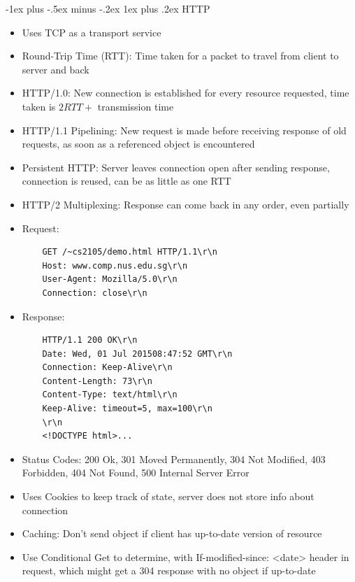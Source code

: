 \documentclass[10pt, landscape]{article}
\makeatletter
\renewcommand{\subsection}{\@startsection{subsection}{3}{0mm}%
                                {-1ex plus -.5ex minus -.2ex}%
                                {1ex plus .2ex}%
                                {\normalfont\small\bfseries}}%
\makeatother
\begin{document}
\begin{multicols*}{3}
\subsection{HTTP}
\begin{itemize}
    \item Uses TCP as a transport service
    \item Round-Trip Time (RTT): Time taken for a packet to travel from client to server and back
    \item HTTP/1.0: New connection is established for every resource requested, time taken is $2RTT+$ transmission time
    \item HTTP/1.1 Pipelining: New request is made before receiving response of old requests, as soon as a referenced object is encountered
    \item Persistent HTTP: Server leaves connection open after sending response, connection is reused, can be as little as one RTT
    \item HTTP/2 Multiplexing: Response can come back in any order, even partially
    \item Request:
\begin{verbatim}
    GET /~cs2105/demo.html HTTP/1.1\r\n
    Host: www.comp.nus.edu.sg\r\n
    User-Agent: Mozilla/5.0\r\n
    Connection: close\r\n
\end{verbatim}
    \item Response:
\begin{verbatim}
    HTTP/1.1 200 OK\r\n
    Date: Wed, 01 Jul 201508:47:52 GMT\r\n
    Connection: Keep-Alive\r\n
    Content-Length: 73\r\n
    Content-Type: text/html\r\n
    Keep-Alive: timeout=5, max=100\r\n
    \r\n
    <!DOCTYPE html>...
\end{verbatim}
    \item Status Codes: 200 Ok, 301 Moved Permanently, 304 Not Modified, 403 Forbidden, 404 Not Found, 500 Internal Server Error
    \item Uses Cookies to keep track of state, server does not store info about connection
    \item Caching: Don't send object if client has up-to-date version of resource
    \item Use Conditional Get to determine, with If-modified-since: <date> header in request, which might get a 304 response with no object if up-to-date
\end{itemize}


\end{multicols*}
\end{document}
